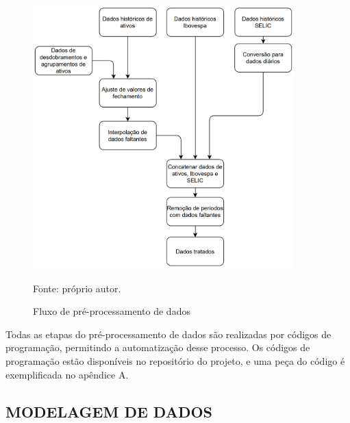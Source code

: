         \begin{figure}[H]
            \centering
            \caption{Fluxo de pré-processamento de dados}
            \label{fig:fluxo_preprocessamento}
            \includegraphics[width=0.9\textwidth]{imagens/fluxo_tratamento.png}
            \par \footnotesize Fonte: próprio autor.
        \end{figure}

        \ipar Todas as etapas do pré-processamento de dados são realizadas por códigos de programação, permitindo a automatização desse processo. Os códigos de programação estão disponíveis no repositório do projeto, e uma peça do código é exemplificada no apêndice A.

    \subsection{MODELAGEM DE DADOS}

